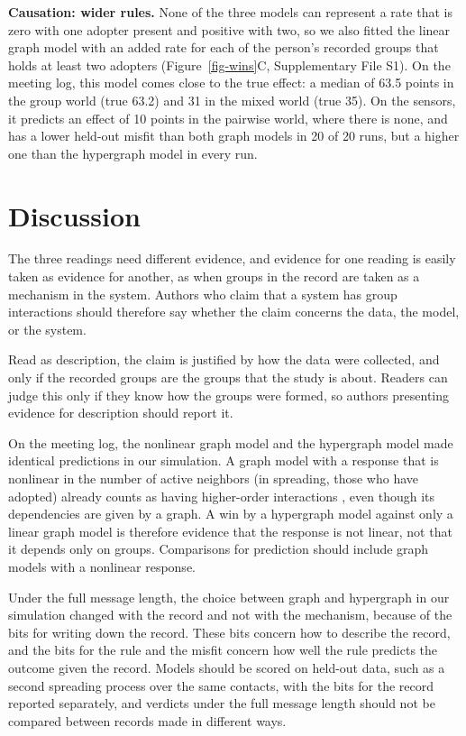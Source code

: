 \documentclass[utf8]{FrontiersinHarvard}
\begin{document}
\textbf{Causation: wider rules.} None of the three models can represent a rate that is zero with one adopter present and positive with two, so we also fitted the linear graph model with an added rate for each of the person's recorded groups that holds at least two adopters (Figure~\ref{fig-wins}C, Supplementary File S1). On the meeting log, this model comes close to the true effect: a median of 63.5 points in the group world (true 63.2) and 31 in the mixed world (true 35). On the sensors, it predicts an effect of 10 points in the pairwise world, where there is none, and has a lower held-out misfit than both graph models in 20 of 20 runs, but a higher one than the hypergraph model in every run.

\section{Discussion}\label{sec-recommendations}

The three readings need different evidence, and evidence for one reading is easily taken as evidence for another, as when groups in the record are taken as a mechanism in the system. Authors who claim that a system has group interactions should therefore say whether the claim concerns the data, the model, or the system.

Read as description, the claim is justified by how the data were collected, and only if the recorded groups are the groups that the study is about. Readers can judge this only if they know how the groups were formed, so authors presenting evidence for description should report it.

On the meeting log, the nonlinear graph model and the hypergraph model made identical predictions in our simulation. A graph model with a response that is nonlinear in the number of active neighbors (in spreading, those who have adopted) already counts as having higher-order interactions \citep{bick2023}, even though its dependencies are given by a graph. A win by a hypergraph model against only a linear graph model is therefore evidence that the response is not linear, not that it depends only on groups. Comparisons for prediction should include graph models with a nonlinear response.

Under the full message length, the choice between graph and hypergraph in our simulation changed with the record and not with the mechanism, because of the bits for writing down the record. These bits concern how to describe the record, and the bits for the rule and the misfit concern how well the rule predicts the outcome given the record. Models should be scored on held-out data, such as a second spreading process over the same contacts, with the bits for the record reported separately, and verdicts under the full message length should not be compared between records made in different ways.
\end{document}
